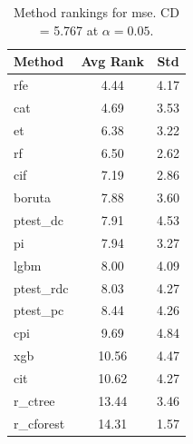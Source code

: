 \begin{table}[h]
\centering
\caption{Method rankings for mse. CD = 5.767 at $\alpha=0.05$.}
\label{tab:ranks_mse}
\begin{tabular}{lcc}
\toprule
Method & Avg Rank & Std \\
\midrule
rfe & 4.44 & 4.17 \\
cat & 4.69 & 3.53 \\
et & 6.38 & 3.22 \\
rf & 6.50 & 2.62 \\
cif & 7.19 & 2.86 \\
boruta & 7.88 & 3.60 \\
ptest_dc & 7.91 & 4.53 \\
pi & 7.94 & 3.27 \\
lgbm & 8.00 & 4.09 \\
ptest_rdc & 8.03 & 4.27 \\
ptest_pc & 8.44 & 4.26 \\
cpi & 9.69 & 4.84 \\
xgb & 10.56 & 4.47 \\
cit & 10.62 & 4.27 \\
r_ctree & 13.44 & 3.46 \\
r_cforest & 14.31 & 1.57 \\
\bottomrule
\end{tabular}
\end{table}